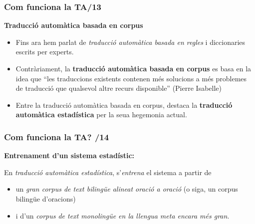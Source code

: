 \documentclass{beamer}
\newcommand{\empha}[1]{\emph{#1}\/}
\begin{document}
\begin{frame}
 \frametitle{Com funciona la TA/13}

\textbf{Traducció automàtica basada en corpus}
 \begin{itemize}
 \item Fins ara hem parlat de \empha{traducció automàtica basada en regles} i diccionaries escrits per experts.
\item Contràriament, la \textbf{traducció automàtica basada en corpus} es basa en la idea que ``les traduccions existents contenen més solucions a més problemes de traducció que qualsevol altre recurs disponible'' (Pierre Isabelle)
\item Entre la traducció automàtica basada en corpus, destaca la
\textbf{traducció automàtica estadística} per la seua hegemonia actual.
 \end{itemize}


\end{frame}


\begin{frame}
 \frametitle{Com funciona la TA? /14}

\textbf{Entrenament d'un sistema estadístic:}

En \empha{traducció automàtica estadística}, s'\empha{entrena} el
sistema a partir de
\begin{itemize}
\item un \empha{gran corpus de text bilingüe alineat oració a
  oració}  (o siga, un corpus bilingüe d'oracions)
\item  i d'un \empha{corpus de text monolingüe en la llengua meta encara més gran}. 
\end{itemize}

\end{frame}
\end{document}
